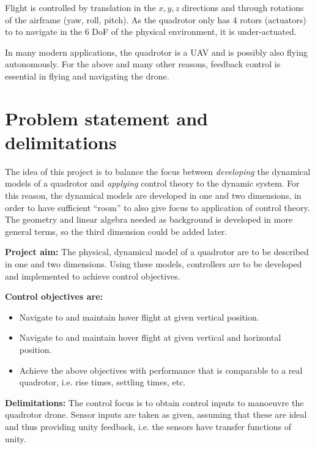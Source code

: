 \documentclass[a4paper]{report}
\newcommand{\sbul}{\begin{itemize}}
\newcommand{\ebul}{\end{itemize}}
\begin{document}
Flight is controlled by translation in the $x,y,z$ directions and through rotations of the airframe (yaw, roll, pitch). 
As the quadrotor only has 4 rotors (actuators) to to navigate in the 6 \gls{DoF} of the physical environment, it is under-actuated.

In many modern applications, the quadrotor is a \gls{UAV} and is possibly also flying autonomously.
For the above and many other reasons, feedback control is essential in flying and navigating the drone.


\section{Problem statement and delimitations}

The idea of this project is to balance the focus between \textit{developing} the dynamical models of a quadrotor and \textit{applying} control theory to the dynamic system. For this reason, the dynamical models are developed in one and two dimensions, in order to have sufficient ``room'' to also give focus to application of control theory.
The geometry and linear algebra needed as background is developed in more general terms, so the third dimension could be added later.

\textbf{Project aim:}
The physical, dynamical model of a quadrotor are to be described in one and two dimensions. Using these models, controllers are to be developed and implemented to achieve control objectives.

\textbf{Control objectives are:}
\sbul
\item Navigate to and maintain hover flight at given vertical position.
\item Navigate to and maintain hover flight at given vertical and horizontal position.
\item Achieve the above objectives with performance that is comparable to a real quadrotor, i.e. rise times, settling times, etc.
\ebul

\textbf{Delimitations:}
The control focus is to obtain control inputs to manoeuvre the quadrotor drone.
Sensor inputs are taken as given, assuming that these are ideal and thus providing unity feedback, i.e. the sensors have transfer functions of unity.
\end{document}
